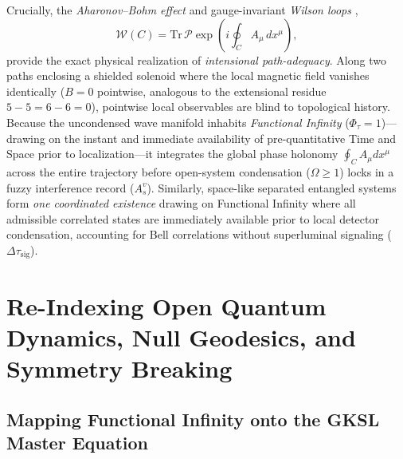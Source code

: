 \documentclass[11pt,a4paper]{article}
\begin{document}
Crucially, the \emph{Aharonov--Bohm effect} \cite{AharonovBohm1959} and gauge-invariant \emph{Wilson loops} \cite{Wilson1974},
\begin{equation}
\mathcal{W}(C) = \mathrm{Tr}\,\mathcal{P}\exp\!\left(i \oint_C A_\mu \, dx^\mu\right),
\end{equation}
provide the exact physical realization of \emph{intensional path-adequacy}. Along two paths enclosing a shielded solenoid where the local magnetic field vanishes identically ($B = 0$ pointwise, analogous to the extensional residue $5 - 5 = 6 - 6 = 0$), pointwise local observables are blind to topological history. Because the uncondensed wave manifold inhabits \emph{Functional Infinity} ($\Phi_\tau = 1$)---drawing on the instant and immediate availability of pre-quantitative Time and Space prior to localization---it integrates the global phase holonomy $\oint_C A_\mu dx^\mu$ across the entire trajectory before open-system condensation ($\Omega \ge 1$) locks in a fuzzy interference record ($A_s^v$). Similarly, space-like separated entangled systems form \emph{one coordinated existence} drawing on Functional Infinity where all admissible correlated states are immediately available prior to local detector condensation, accounting for Bell correlations \cite{Bell1964} without superluminal signaling ($\Delta\tau_{\mathrm{sig}}$).

\section{Re-Indexing Open Quantum Dynamics, Null Geodesics, and Symmetry Breaking}

\subsection{Mapping Functional Infinity onto the GKSL Master Equation}
\end{document}
